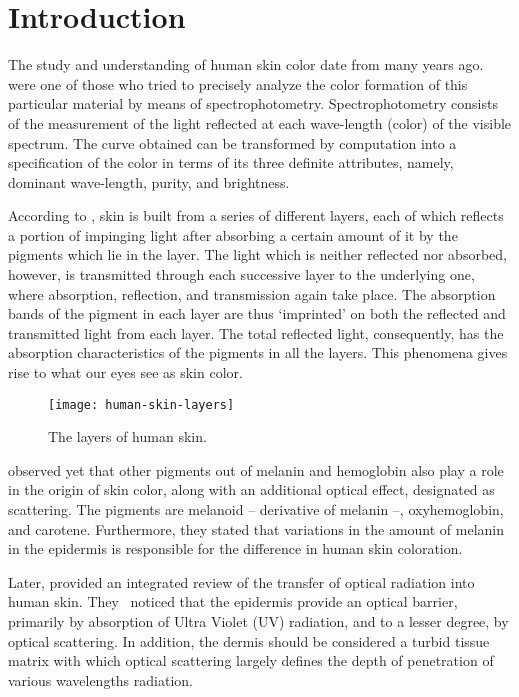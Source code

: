 \chapter{Introduction}
\label{cap:introducao}
The study and understanding of human skin color date from many years ago. \citet{edwards:39} were one of those who tried to precisely analyze the color formation of this particular material by means of spectrophotometry. Spectrophotometry consists of the measurement of the light reflected at each wave-length (color) of the visible spectrum. The curve obtained can be transformed by computation into a specification of the color in terms of its three definite attributes, namely, dominant wave-length, purity, and brightness.

According to \citet{edwards:39}, skin is built from a series of different layers, each of which reflects a portion of impinging light after absorbing a certain amount of it by the pigments which lie in the layer. The light which is neither reflected nor absorbed, however, is transmitted through each successive layer to the underlying one, where absorption, reflection, and transmission again take place. The absorption bands of the pigment in each layer are thus ‘imprinted’ on both the reflected and transmitted light from each layer. The total reflected light, consequently, has the absorption characteristics of the pigments in all the layers. This phenomena gives rise to what our eyes see as skin color.

\begin{figure}[!hb]
  \centering
  \texttt{[image: human-skin-layers]}
  \caption{The layers of human skin.}
  \label{fig:human-skin-layers} 
\end{figure}

\citet{edwards:39} observed yet that other pigments out of melanin and hemoglobin also play a role in the origin of skin color, along with an additional optical effect, designated as scattering. The pigments are melanoid -- derivative of melanin --, oxyhemoglobin, and carotene. Furthermore, they stated that variations in the amount of melanin in the epidermis is responsible for the difference in human skin coloration.

Later, \citet{anderson:81} provided an integrated review of the transfer of optical radiation into human skin. They~\citep{anderson:81} noticed that the epidermis provide an optical barrier, primarily by absorption of Ultra Violet (UV) radiation, and to a lesser degree, by optical scattering. In addition, the dermis should be considered a turbid tissue matrix with which optical scattering largely defines the depth of penetration of various wavelengths radiation.


